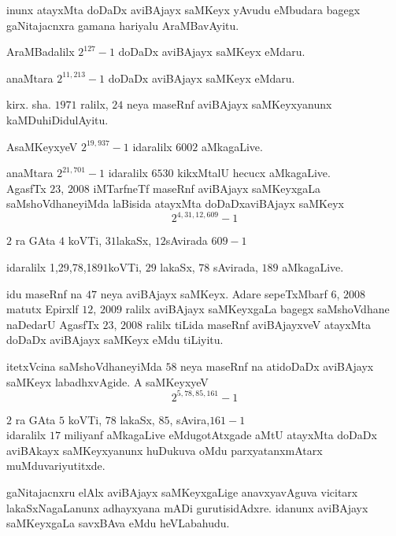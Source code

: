 inunx atayxMta doDaDx aviBAjayx saMKeyx yAvudu eMbudara bagegx gaNitajacnxra gamana hariyalu AraMBavAyitu.

AraMBadalilx $2^{127}-1$ doDaDx aviBAjayx saMKeyx eMdaru.

anaMtara $2^{11,213}-1$ doDaDx aviBAjayx saMKeyx eMdaru.

kirx. sha. $1971$ ralilx, $24$ neya maseRnf aviBAjayx saMKeyxyanunx kaMDuhiDidulAyitu.

AsaMKeyxyeV $2^{19,937}-1$ idaralilx $6002$ aMkagaLive.

anaMtara $2^{21,701}-1$ idaralilx $6530$ kikxMtalU hecucx aMkagaLive.\\
AgasfTx $23$, $2008$ iMTarfneTf maseRnf aviBAjayx saMKeyxgaLa saMshoVdhaneyiMda laBisida atayxMta doDaDxaviBAjayx saMKeyx
$$ 
2^{4,31,12,609}-1
$$

$2$ ra GAta $4$ koVTi, $31$lakaSx, $12$sAvirada $609-1$

idaralilx {\rm 1,29,78,189}\quad $1$koVTi, $29$ lakaSx, $78$ sAvirada, $189$ aMkagaLive.

idu maseRnf na $47$ neya aviBAjayx saMKeyx. Adare sepeTxMbarf $6$, $2008$ matutx Epirxlf $12$, $2009$ ralilx aviBAjayx saMKeyxgaLa bagegx saMshoVdhane naDedarU AgasfTx $23$, $2008$ ralilx tiLida maseRnf aviBAjayxveV atayxMta doDaDx aviBAjayx saMKeyx eMdu tiLiyitu. 

itetxVcina saMshoVdhaneyiMda $58$ neya maseRnf na atidoDaDx aviBAjayx saMKeyx labadhxvAgide. A saMKeyxyeV 
$$
2^{5,78,85,161}-1
$$

$2$ ra GAta $5$ koVTi, $78$ lakaSx, $85$, sAvira,$161 - 1$\\
idaralilx $17$ miliyanf aMkagaLive eMdugotAtxgade aMtU atayxMta doDaDx aviBAkayx saMKeyxyanunx huDukuva oMdu parxyatanxmAtarx muMduvariyutitxde.

gaNitajacnxru elAlx aviBAjayx saMKeyxgaLige anavxyavAguva vicitarx lakaSxNagaLanunx adhayxyana mADi gurutisidAdxre. idanunx aviBAjayx saMKeyxgaLa savxBAva eMdu heVLabahudu.

